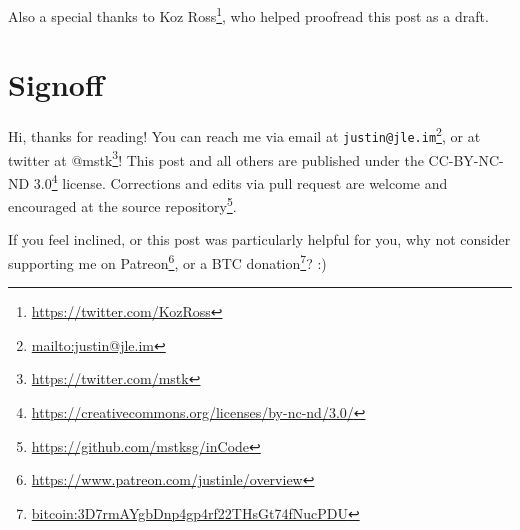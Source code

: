 \documentclass[]{article}
\renewcommand{\href}[2]{#2\footnote{\url{#1}}}
\begin{document}
Also a special thanks to \href{https://twitter.com/KozRoss}{Koz Ross}, who
helped proofread this post as a draft.

\hypertarget{signoff}{%
\section{Signoff}\label{signoff}}

Hi, thanks for reading! You can reach me via email at
\href{mailto:justin@jle.im}{\nolinkurl{justin@jle.im}}, or at twitter at
\href{https://twitter.com/mstk}{@mstk}! This post and all others are published
under the \href{https://creativecommons.org/licenses/by-nc-nd/3.0/}{CC-BY-NC-ND
3.0} license. Corrections and edits via pull request are welcome and encouraged
at \href{https://github.com/mstksg/inCode}{the source repository}.

If you feel inclined, or this post was particularly helpful for you, why not
consider \href{https://www.patreon.com/justinle/overview}{supporting me on
Patreon}, or a \href{bitcoin:3D7rmAYgbDnp4gp4rf22THsGt74fNucPDU}{BTC donation}?
:)
\end{document}
